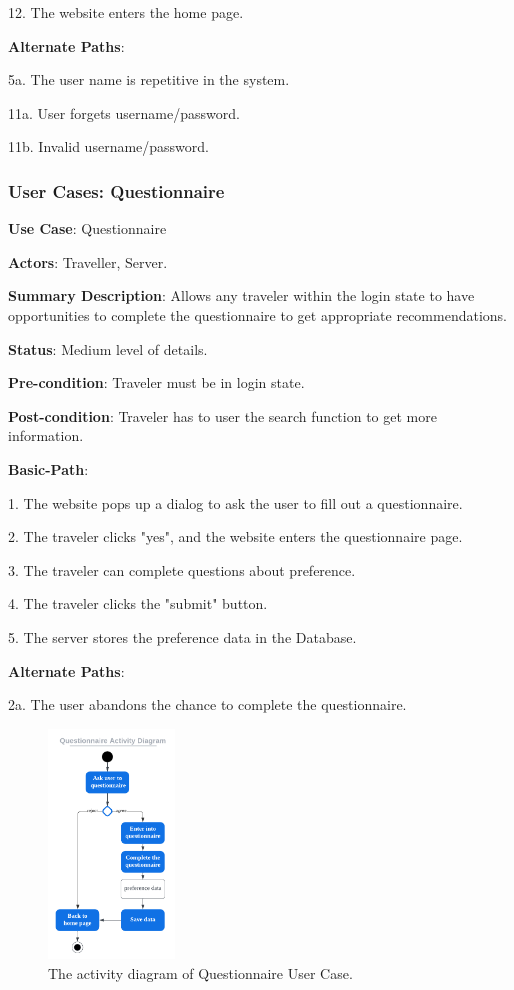 \documentclass[conference]{IEEEtran}
\begin{document}
12. The website enters the home page.


\textbf{Alternate Paths}:

5a. The user name is repetitive in the system.

11a. User forgets username/password.

11b. Invalid username/password.

\subsubsection{User Cases: Questionnaire}

\textbf{ }

\textbf{Use Case}: Questionnaire

\textbf{Actors}: Traveller, Server.

\textbf{Summary Description}: Allows any traveler within the login state to have opportunities to complete the questionnaire to get appropriate recommendations.
 
\textbf{Status}: Medium level of details.

\textbf{Pre-condition}: Traveler must be in login state.

\textbf{Post-condition}: Traveler has to user the search function to get more information.

\textbf{Basic-Path}:

1. The website pops up a dialog to ask the user to fill out a questionnaire.

2. The traveler clicks "yes", and the website enters the questionnaire page.

3. The traveler can complete questions about preference.

4. The traveler clicks the "submit" button.

5. The server stores the preference data in the Database.

\textbf{Alternate Paths}:

2a. The user abandons the chance to complete the questionnaire.


\begin{figure}[htbp]
\centerline{\includegraphics[width=0.3\textwidth]{activity_diagram_question.pdf}}
\caption{The activity diagram of Questionnaire User Case.}
\label{fig2}
\end{figure}
\end{document}
